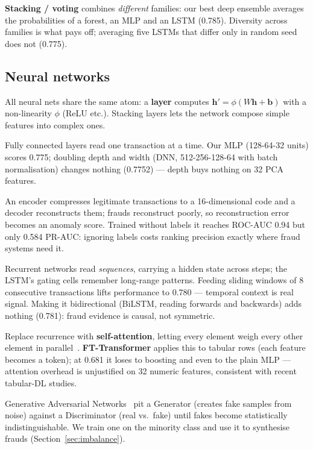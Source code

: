 \documentclass[11pt,a4paper]{article}
\newcommand{\term}[1]{\textbf{\textcolor{accent}{#1}}}
\begin{document}
\term{Stacking / voting} combines \emph{different} families: our best deep ensemble averages the
probabilities of a forest, an MLP and an LSTM (0.785). Diversity across families is what pays
off; averaging five LSTMs that differ only in random seed does not (0.775).

\subsection{Neural networks}
All neural nets share the same atom: a \term{layer} computes
$\mathbf{h}' = \phi(W\mathbf{h} + \mathbf{b})$ with a non-linearity $\phi$ (ReLU etc.).
Stacking layers lets the network compose simple features into complex ones.

\begin{description}[leftmargin=1.4em, style=nextline]
      \item[MLP / DNN (feed-forward).] Fully connected layers read one transaction at a time.
            Our MLP (128-64-32 units) scores 0.775; doubling depth and width (DNN, 512-256-128-64
            with batch normalisation) changes nothing (0.7752) --- depth buys nothing on 32
            PCA features.
      \item[Autoencoder.] An encoder compresses legitimate transactions to a 16-dimensional code
            and a decoder reconstructs them; frauds reconstruct poorly, so reconstruction error
            becomes an anomaly score. Trained without labels it reaches ROC-AUC 0.94 but only
            0.584 PR-AUC: ignoring labels costs ranking precision exactly where fraud systems
            need it.
      \item[RNN / LSTM.] Recurrent networks read \emph{sequences}, carrying a hidden state across
            steps; the LSTM's gating cells remember long-range patterns. Feeding sliding windows
            of 8 consecutive transactions lifts performance to 0.780 --- temporal context is real
            signal. Making it bidirectional (BiLSTM, reading forwards and backwards) adds nothing
            (0.781): fraud evidence is causal, not symmetric.
      \item[Transformers.] Replace recurrence with \term{self-attention}, letting every element
            weigh every other element in parallel~\cite{vaswani2017}. \textbf{FT-Transformer}
            applies this to tabular rows (each feature becomes a token); at 0.681 it loses to
            boosting and even to the plain MLP --- attention overhead is unjustified on 32 numeric
            features, consistent with recent tabular-DL studies.
      \item[GANs.] Generative Adversarial Networks~\cite{goodfellow2014} pit a Generator (creates
            fake samples from noise) against a Discriminator (real vs.\ fake) until fakes become
            statistically indistinguishable. We train one on the minority class and use it to
            synthesise frauds (Section~\ref{sec:imbalance}).
\end{description}
\end{document}
